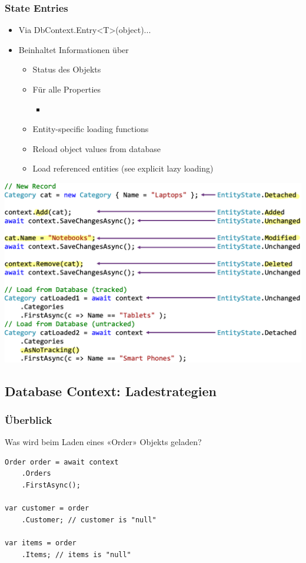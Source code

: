 \subsubsection{State Entries}
\begin{itemize}
    \item Via DbContext.Entry<T>(object)...
    \item Beinhaltet Informationen über
    \begin{itemize}
        \item Status des Objekts
        \item Für alle Properties
        \begin{itemize}
            \item
        \end{itemize}
        \item Entity-specific loading functions
        \item Reload object values from database
        \item Load referenced entities (see explicit lazy loading)
    \end{itemize}
\end{itemize}
\vspace{-8pt}
\begin{center}
    \includegraphics[scale=.44]{graphic/efc/state entries.png}
\end{center}
\vspace{-8pt}


\subsection{Database Context: Ladestrategien}

\subsubsection{Überblick}
Was wird beim Laden eines «Order» Objekts geladen?
\begin{lstlisting}
Order order = await context
    .Orders
    .FirstAsync();

var customer = order
    .Customer; // customer is "null"

var items = order
    .Items; // items is "null"
\end{lstlisting}

